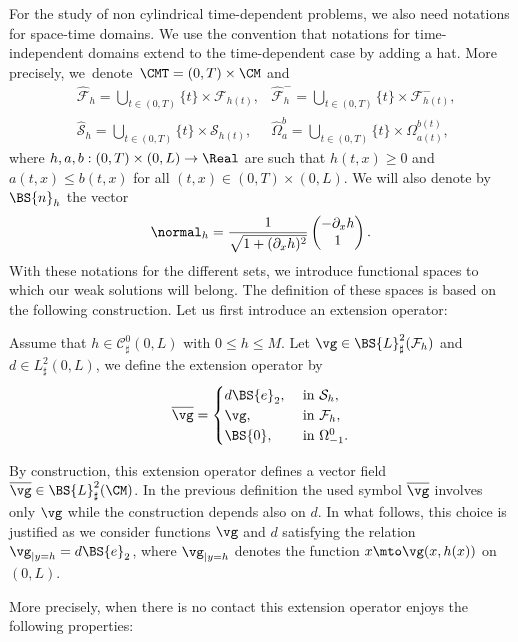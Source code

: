 For the study of non cylindrical time-dependent problems, we also need notations for space-time domains.
We use the convention that notations for time-independent domains extend to the time-dependent case by
adding a hat. More precisely, we~\hbox{denote}~$\CMT=(0,T)\times\CM$ and
\[\begin{aligned}
&\widehat{\mathcal{F}}_{h}=\bigcup_{t\in(0, T)}\{t\}\times\mathcal{F}_{h(t)}, &\widehat{\mathcal{F}}_{h}^{-}=\bigcup_{t\in(0, T)}\{t\}\times\mathcal{F}_{h(t)}^{-},\\
&\widehat{\mathcal{S}}_{h}=\bigcup_{t\in(0, T)}\{t\}\times\mathcal{S}_{h(t)}, &\widehat{\Omega}_{a}^{b}=\bigcup_{t\in(0, T)}\{t\}\times\Omega_{a(t)}^{b(t)},
\end{aligned}\]
where $h,a,b:(0,T)\times(0,L)\rightarrow \Real$ are such that $h(t,x)\geq 0$ and $a(t,x)\leq b(t,x)$ for all $(t,x)\in (0,T)\times(0,L)$. 
We will also denote by $\BS{n}_h$ the vector
\[
\normal_{h}=\frac{1}{\sqrt{1+(\partial_{x}h)^{2}}}\begin{pmatrix}
-\partial_{x}h\\
1
\end{pmatrix}.
\]
With these notations for the different sets, we introduce functional spaces
to which our weak solutions will belong.
The definition of these spaces is based on the following construction.
Let us first introduce an extension operator:
\begin{definition}
\label{def:bar}
Assume that $h\in \mathcal{C}^0_\sharp(0, L)$ with $0 \leq h \leq M$.
Let $\vg \in \BS{L}^2_{\sharp}(\mathcal{F}_h)$ and $d\in L^2_\sharp(0, L)$, we define the extension operator by
\[
\overline \vg= 
\begin{cases}
d \BS{e}_{2}, &\text{ in } \mathcal{S}_h,\\
\vg,&\text{ in } \mathcal{F}_h,\\
\BS{0},& \text{ in } \Omega_{-1}^0.
\end{cases}
\]
\end{definition}
\begin{remark}
By construction, this extension operator defines a vector field $\overline \vg \in \BS{L}^2_\sharp(\CM)$.
In the previous definition the used symbol $\overline{\vg}$ involves only $\vg$ while the construction depends also on $d$. In what follows, this choice is justified as we consider functions $\vg$ and $d$ satisfying the relation $\vg_{|{y=h}}= d\BS{e}_{2}$, where $\vg_{|{y=h}}$ denotes the function $x\mto \vg(x, h(x))$ on $(0, L)$.
\end{remark}
More precisely, when there is no contact this extension operator enjoys the following properties:
